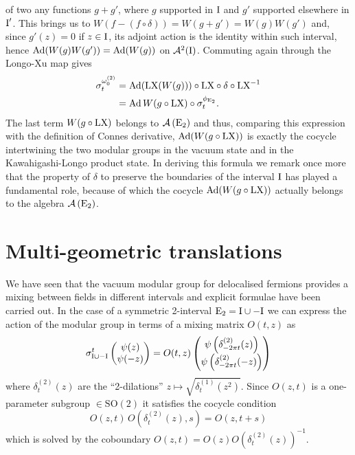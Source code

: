  of two any functions $g+g'$, where $g$ supported in $\textrm{I}$ and
 $g'$ supported elsewhere in $\textrm{I}'$. This brings us to
 $W(f-(f\circ\delta))=W(g+g')=W(g)W(g')$ and, since $g'(z)=0$
 if $z\in\textrm{I}$, its adjoint action is the identity within such
 interval, hence $\operatorname{Ad}(W(g)W(g'))=\operatorname{Ad}(W(g))$ on $\mathcal{A}^2(\textrm{I})$.
 Commuting again through the Longo-Xu map gives
 \begin{align*}
 \sigma_t^{\omega_0^{(2)}}&=\operatorname{Ad}(\textrm{LX}(W(g)))
 \circ\textrm{LX}\circ\delta\circ\textrm{LX}^{-1}\\
 &=\operatorname{Ad}{W(g\circ\textrm{LX})}\circ\sigma_t^{\phi_{\textrm{E}_2}}.
 \end{align*}
 The last term $W(g\circ\textrm{LX})$ belongs to $\mathcal{A}\left(\textrm{E}_2\right)$
 and thus, comparing this expression with the definition
 of Connes derivative, $\operatorname{Ad}(W(g\circ\textrm{LX}))$ is
 exactly the cocycle intertwining the two modular groups
 in the vacuum state and in the Kawahigashi-Longo product state.
 In deriving this formula we remark once more that the property
 of $\delta$ to preserve the boundaries of the interval
 $\textrm{I}$ has played a fundamental role, because of which
 the cocycle $\operatorname{Ad}(W(g\circ\textrm{LX}))$ actually belongs to the
 algebra $\mathcal{A}\left(\textrm{E}_2\right)$.
 
 

 \section{Multi-geometric translations}
 \label{Multi-geometric translations}
 We have seen that the vacuum modular group for 
 delocalised fermions provides a mixing 
 between fields in different intervals and explicit formulae
 have been carried out. In the case of a symmetric 
 2-interval $\textrm{E}_2=\textrm{I}\cup -\textrm{I}$  
 we can express the action of the modular
 group in terms of a mixing matrix $O(t,z)$ as
 \[
 \sigma^t_{\textrm{I}\cup -\textrm{I}}
 \begin{pmatrix}
 \psi(z)\\
 \psi(-z)
 \end{pmatrix}
 = O(t,z)
 \begin{pmatrix}
 \psi\left(\delta^{(2)}_{-2\pi t}(z)\right)\\
 \psi\left(\delta^{(2)}_{-2\pi t}(-z)\right)
 \end{pmatrix}
 \]
 where $\delta^{(2)}_{t}(z)$ are the ``2-dilations''
 $z\mapsto \sqrt{\delta^{(1)}_{t}(z^2)}$. 
 Since $O(z,t)$ is a one-parameter subgroup $\in
 \textrm{SO}(2)$ it satisfies the cocycle condition
 \[
 O(z,t)\,O\left(\delta^{(2)}_{t}(z),s\right)=O(z,t+s) 
 \]
 which is solved by the coboundary $O(z,t)=O(z)
 O(\delta^{(2)}_{t}(z))^{-1}$. 
 
